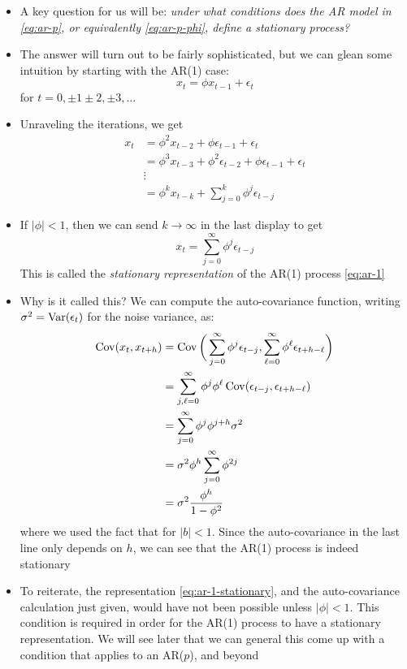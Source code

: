\documentclass{article}
\begin{document}
\begin{itemize}
\item A key question for us will be: \emph{under what conditions does the AR
    model  in \eqref{eq:ar-p}, or equivalently \eqref{eq:ar-p-phi}, define a
    stationary process?} 

\item The answer will turn out to be fairly sophisticated, but we can glean some
  intuition by starting with the AR(1) case: 
  \begin{equation}
  \label{eq:ar-1}
  x_t = \phi x_{t-1} + \epsilon_t 
  \end{equation}
  for  $t = 0, \pm 1 \pm 2, \pm 3,\dots$ 

\item Unraveling the iterations, we get
  \begin{align*}
  x_t &= \phi^2 x_{t-2} + \phi \epsilon_{t-1} + \epsilon_t \\
  &= \phi^3 x_{t-3} + \phi^2 \epsilon_{t-2} + \phi \epsilon_{t-1} + \epsilon_t
    \\  
  &\vdots \\ 
  &= \phi^k x_{t-k} + \sum_{j=0}^k \phi^j \epsilon_{t-j} 
  \end{align*}

\item If $|\phi| < 1$, then we can send $k \to \infty$ in the last display to 
  get 
  \begin{equation}
  \label{eq:ar-1-stationary}
  x_t = \sum_{j=0}^\infty \phi^j \epsilon_{t-j} 
  \end{equation}
  This is called the \emph{stationary representation} of the AR(1) process
  \eqref{eq:ar-1} 

\item Why is it called this? We can compute the auto-covariance function,
  writing $\sigma^2 = \operatorname{Var}(\epsilon_t)$ for the noise variance, as: 
  \begin{align*}
  \operatorname{Cov}(x_t, x_{t+h}) &= \operatorname{Cov}\bigg( \sum_{j=0}^\infty \phi^j \epsilon_{t-j}, 
  \sum_{\ell=0}^\infty \phi^\ell \epsilon_{t+h-\ell} \bigg) \\
  &= \sum_{j,\ell=0}^\infty \phi^j \phi^\ell \operatorname{Cov}( \epsilon_{t-j},
    \epsilon_{t+h-\ell} ) \\
  &= \sum_{j=0}^\infty \phi^j \phi^{j+h} \sigma^2 \\
  &= \sigma^2 \phi^h \sum_{j=0}^\infty \phi^{2j} \\
  &= \sigma^2 \frac{\phi^h}{1 - \phi^2} 
  \end{align*}
  where we used the fact that  for $|b|
  < 1$. Since the auto-covariance in the last line only depends on $h$, we can
  see that the AR(1) process is indeed stationary

\item To reiterate, the representation \eqref{eq:ar-1-stationary}, and the
  auto-covariance calculation just given, would have not been possible unless
  $|\phi| < 1$. This condition is required in order for the AR(1) process to
  have a stationary representation. We will see later that we can general this
  come up with a condition that applies to an AR($p$), and beyond
\end{itemize}
\end{document}
